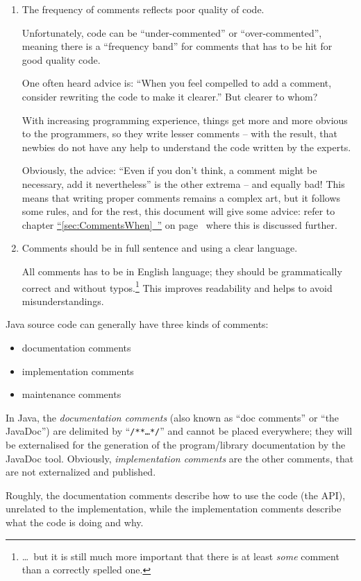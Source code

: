 \documentclass[11pt,a4paper, titlepage, parskip=half, headsepline, footsepline, cleardoublepage=current, headheight=1cm]{scrbook}
\newcommand*{\tqfullvref}[1]{\hyperref[{#1}]{“\ref*{#1}~\nameref*{#1}”} on page~\pageref{#1}}
\begin{document}
\begin{enumerate}[label=P\arabic*.]
\item{The frequency of comments reflects poor quality of code.

Unfortunately, code can be “under-commented” or “over-commented”, meaning there is a “frequency band” for comments that has to be hit for good quality code.

One often heard advice is: “When you feel compelled to add a comment, consider rewriting the code to make it clearer.” But clearer to whom?

With increasing programming experience, things get more and more obvious to the programmers, so they write lesser comments – with the result, that newbies do not have any help to understand the code written by the experts.

Obviously, the advice: “Even if you don't think, a comment might be necessary, add it nevertheless” is the other extrema – and equally bad! This means that writing proper comments remains a complex art, but it follows some rules, and for the rest, this document will give some advice: refer to chapter \tqfullvref{sec:CommentsWhen} where this is discussed further.}

\item{Comments should be in full sentence and using a clear language.

All comments has to be in English language; they should be grammatically correct and without typos.\footnote{…~but it is still much more important that there is at least \textit{some} comment than a correctly spelled one.} This improves readability and helps to avoid misunderstandings.}
\end{enumerate}

Java source code can generally have three kinds of comments:
\begin{itemize}[nosep]
\item{documentation comments}
\item{implementation comments}
\item{maintenance comments}
\end{itemize}

In Java, the \textit{documentation comments} (also known as “doc comments” or “the JavaDoc”) are delimited by “\verb#/**…*/#” and cannot be placed everywhere; they will be externalised for the generation of the program/library documentation by the JavaDoc tool. Obviously, \textit{implementation comments} are the other comments, that are not externalized and published.

Roughly, the documentation comments describe how to use the code (the API), unrelated to the implementation, while the implementation comments describe what the code is doing and why.
\end{document}
